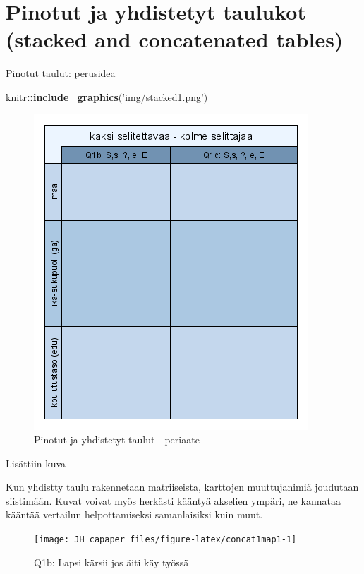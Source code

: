 \documentclass[
  finnish,
]{book}
\newenvironment{Shaded}{\begin{snugshade}}{\end{snugshade}}
\newcommand{\KeywordTok}[1]{\textcolor[rgb]{0.13,0.29,0.53}{\textbf{#1}}}
\newcommand{\NormalTok}[1]{#1}
\newcommand{\OperatorTok}[1]{\textcolor[rgb]{0.81,0.36,0.00}{\textbf{#1}}}
\newcommand{\StringTok}[1]{\textcolor[rgb]{0.31,0.60,0.02}{#1}}
\begin{document}
\hypertarget{pinotut-ja-yhdistetyt-taulukot-stacked-and-concatenated-tables}{%
\section{Pinotut ja yhdistetyt taulukot (stacked and concatenated tables)}\label{pinotut-ja-yhdistetyt-taulukot-stacked-and-concatenated-tables}}

Pinotut taulut: perusidea

\begin{Shaded}
\begin{Highlighting}[]
\NormalTok{knitr}\OperatorTok{::}\KeywordTok{include_graphics}\NormalTok{(}\StringTok{'img/stacked1.png'}\NormalTok{)}
\end{Highlighting}
\end{Shaded}

\begin{figure}

{\centering \includegraphics[width=0.5\linewidth]{img/stacked1} 

}

\caption{Pinotut ja yhdistetyt taulut - periaate}\label{fig:stackedimg1}
\end{figure}

Lisättiin kuva

Kun yhdistty taulu rakennetaan matriiseista, karttojen muuttujanimiä joudutaan
siistimään. Kuvat voivat myös herkästi kääntyä akselien ympäri, ne kannataa
kääntää vertailun helpottamiseksi samanlaisiksi kuin muut.

\begin{figure}

{\centering \texttt{[image: JH\_capaper\_files/figure-latex/concat1map1-1]} 

}

\caption{Q1b: Lapsi kärsii jos äiti käy työssä}\label{fig:concat1map1}
\end{figure}
\end{document}
